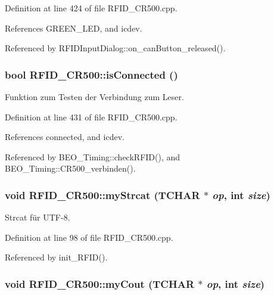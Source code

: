 Definition at line 424 of file RFID\_\-CR500.cpp.

References GREEN\_\-LED, and icdev.

Referenced by RFIDInputDialog::on\_\-canButton\_\-released().\hypertarget{class_r_f_i_d___c_r500_b349b713f9636e8f3c04ca4295bc3248}{
\subsubsection[isConnected]{\setlength{\rightskip}{0pt plus 5cm}bool RFID\_\-CR500::isConnected ()}}
\label{class_r_f_i_d___c_r500_b349b713f9636e8f3c04ca4295bc3248}


Funktion zum Testen der Verbindung zum Leser. 



Definition at line 431 of file RFID\_\-CR500.cpp.

References connected, and icdev.

Referenced by BEO\_\-Timing::checkRFID(), and BEO\_\-Timing::CR500\_\-verbinden().\hypertarget{class_r_f_i_d___c_r500_04bf682d670036b022d674c96a855140}{
\subsubsection[myStrcat]{\setlength{\rightskip}{0pt plus 5cm}void RFID\_\-CR500::myStrcat (TCHAR $\ast$ {\em op}, \/  int {\em size})}}
\label{class_r_f_i_d___c_r500_04bf682d670036b022d674c96a855140}


Strcat für UTF-8. 



Definition at line 98 of file RFID\_\-CR500.cpp.

Referenced by init\_\-RFID().\hypertarget{class_r_f_i_d___c_r500_45353483301fecf71b2c2d0c386e30e2}{
\subsubsection[myCout]{\setlength{\rightskip}{0pt plus 5cm}void RFID\_\-CR500::myCout (TCHAR $\ast$ {\em op}, \/  int {\em size})}}
\label{class_r_f_i_d___c_r500_45353483301fecf71b2c2d0c386e30e2}


